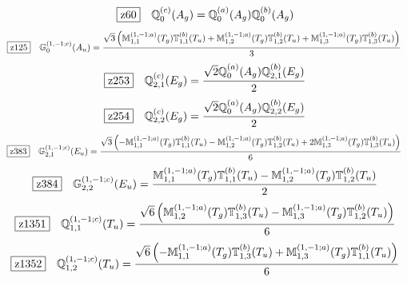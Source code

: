 \documentclass[fleqn,10pt,landscape]{jsarticle}
\begin{document}
\begin{dmath*}
\hspace*{3mm}\fbox{z60}\quad \mathbb{Q}_{0}^{(c)}(A_{g})=\mathbb{Q}_{0}^{(a)}(A_{g}) \mathbb{Q}_{0}^{(b)}(A_{g})
\end{dmath*}
\begin{dmath*}
\hspace*{3mm}\fbox{z125}\quad \mathbb{G}_{0}^{(1,-1;c)}(A_{u})=\frac{\sqrt{3} \left(\mathbb{M}_{1,1}^{(1,-1;a)}(T_{g}) \mathbb{T}_{1,1}^{(b)}(T_{u}) + \mathbb{M}_{1,2}^{(1,-1;a)}(T_{g}) \mathbb{T}_{1,2}^{(b)}(T_{u}) + \mathbb{M}_{1,3}^{(1,-1;a)}(T_{g}) \mathbb{T}_{1,3}^{(b)}(T_{u})\right)}{3}
\end{dmath*}
\begin{dmath*}
\hspace*{3mm}\fbox{z253}\quad \mathbb{Q}_{2,1}^{(c)}(E_{g})=\frac{\sqrt{2} \mathbb{Q}_{0}^{(a)}(A_{g}) \mathbb{Q}_{2,1}^{(b)}(E_{g})}{2}
\end{dmath*}
\begin{dmath*}
\hspace*{3mm}\fbox{z254}\quad \mathbb{Q}_{2,2}^{(c)}(E_{g})=\frac{\sqrt{2} \mathbb{Q}_{0}^{(a)}(A_{g}) \mathbb{Q}_{2,2}^{(b)}(E_{g})}{2}
\end{dmath*}
\begin{dmath*}
\hspace*{3mm}\fbox{z383}\quad \mathbb{G}_{2,1}^{(1,-1;c)}(E_{u})=\frac{\sqrt{3} \left(- \mathbb{M}_{1,1}^{(1,-1;a)}(T_{g}) \mathbb{T}_{1,1}^{(b)}(T_{u}) - \mathbb{M}_{1,2}^{(1,-1;a)}(T_{g}) \mathbb{T}_{1,2}^{(b)}(T_{u}) + 2 \mathbb{M}_{1,3}^{(1,-1;a)}(T_{g}) \mathbb{T}_{1,3}^{(b)}(T_{u})\right)}{6}
\end{dmath*}
\begin{dmath*}
\hspace*{3mm}\fbox{z384}\quad \mathbb{G}_{2,2}^{(1,-1;c)}(E_{u})=\frac{\mathbb{M}_{1,1}^{(1,-1;a)}(T_{g}) \mathbb{T}_{1,1}^{(b)}(T_{u}) - \mathbb{M}_{1,2}^{(1,-1;a)}(T_{g}) \mathbb{T}_{1,2}^{(b)}(T_{u})}{2}
\end{dmath*}
\begin{dmath*}
\hspace*{3mm}\fbox{z1351}\quad \mathbb{Q}_{1,1}^{(1,-1;c)}(T_{u})=\frac{\sqrt{6} \left(\mathbb{M}_{1,2}^{(1,-1;a)}(T_{g}) \mathbb{T}_{1,3}^{(b)}(T_{u}) - \mathbb{M}_{1,3}^{(1,-1;a)}(T_{g}) \mathbb{T}_{1,2}^{(b)}(T_{u})\right)}{6}
\end{dmath*}
\begin{dmath*}
\hspace*{3mm}\fbox{z1352}\quad \mathbb{Q}_{1,2}^{(1,-1;c)}(T_{u})=\frac{\sqrt{6} \left(- \mathbb{M}_{1,1}^{(1,-1;a)}(T_{g}) \mathbb{T}_{1,3}^{(b)}(T_{u}) + \mathbb{M}_{1,3}^{(1,-1;a)}(T_{g}) \mathbb{T}_{1,1}^{(b)}(T_{u})\right)}{6}
\end{dmath*}
\end{document}
